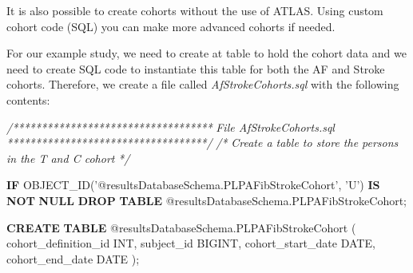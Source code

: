 \documentclass[]{article}
\newenvironment{Shaded}{\begin{snugshade}}{\end{snugshade}}
\newcommand{\KeywordTok}[1]{\textcolor[rgb]{0.13,0.29,0.53}{\textbf{#1}}}
\newcommand{\DataTypeTok}[1]{\textcolor[rgb]{0.13,0.29,0.53}{#1}}
\newcommand{\StringTok}[1]{\textcolor[rgb]{0.31,0.60,0.02}{#1}}
\newcommand{\CommentTok}[1]{\textcolor[rgb]{0.56,0.35,0.01}{\textit{#1}}}
\newcommand{\NormalTok}[1]{#1}
\begin{document}
It is also possible to create cohorts without the use of ATLAS. Using
custom cohort code (SQL) you can make more advanced cohorts if needed.

For our example study, we need to create at table to hold the cohort
data and we need to create SQL code to instantiate this table for both
the AF and Stroke cohorts. Therefore, we create a file called
\emph{AfStrokeCohorts.sql} with the following contents:

\begin{Shaded}
\begin{Highlighting}[]
\CommentTok{/***********************************}
\CommentTok{File AfStrokeCohorts.sql }
\CommentTok{***********************************/}
\CommentTok{/*}
\CommentTok{  Create a table to store the persons in the T and C cohort}
\CommentTok{*/}

\KeywordTok{IF}\NormalTok{ OBJECT_ID(}\StringTok{'@resultsDatabaseSchema.PLPAFibStrokeCohort'}\NormalTok{, }\StringTok{'U'}\NormalTok{) }\KeywordTok{IS} \KeywordTok{NOT} \KeywordTok{NULL} 
  \KeywordTok{DROP} \KeywordTok{TABLE}\NormalTok{ @resultsDatabaseSchema.PLPAFibStrokeCohort;}

\KeywordTok{CREATE} \KeywordTok{TABLE}\NormalTok{ @resultsDatabaseSchema.PLPAFibStrokeCohort }
\NormalTok{( }
\NormalTok{  cohort_definition_id }\DataTypeTok{INT}\NormalTok{, }
\NormalTok{  subject_id BIGINT,}
\NormalTok{  cohort_start_date }\DataTypeTok{DATE}\NormalTok{, }
\NormalTok{  cohort_end_date }\DataTypeTok{DATE}
\NormalTok{);}



\end{Highlighting}
\end{Shaded}
\end{document}
